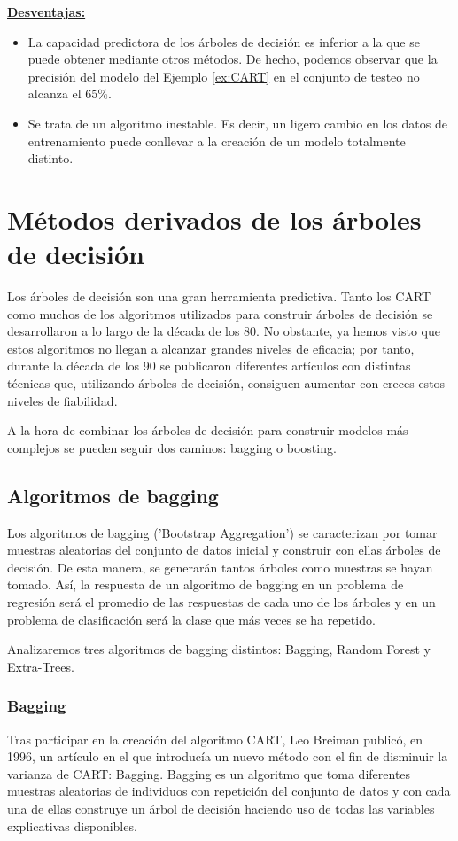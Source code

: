 \documentclass[12pt,twoside]{article}
\begin{document}
\textbf{\underline{Desventajas:}}
\begin{itemize}
\item La capacidad predictora de los árboles de decisión es inferior a la que se puede obtener mediante otros métodos. De hecho, podemos observar que la precisión del modelo del Ejemplo \ref{ex:CART} en el conjunto de testeo no alcanza el $65\%$.
\item Se trata de un algoritmo inestable. Es decir, un ligero cambio en los datos de entrenamiento puede conllevar a la creación de un modelo totalmente distinto. %
\end{itemize}



\newpage
\section{Métodos derivados de los árboles de decisión}
Los árboles de decisión son una gran herramienta predictiva. Tanto los CART como muchos de los algoritmos utilizados para construir árboles de decisión se desarrollaron a lo largo de la década de los 80. No obstante, ya hemos visto que estos algoritmos no llegan a alcanzar grandes niveles de eficacia; por tanto, durante la década de los 90 se publicaron diferentes artículos con distintas técnicas que, utilizando árboles de decisión, consiguen aumentar con creces estos niveles de fiabilidad.

A la hora de combinar los árboles de decisión para construir modelos más complejos se pueden seguir dos caminos: bagging o boosting.


\subsection{Algoritmos de bagging}
Los algoritmos de bagging ('Bootstrap Aggregation') se caracterizan por tomar muestras aleatorias del conjunto de datos inicial y construir con ellas árboles de decisión. De esta manera, se generarán tantos árboles como muestras se hayan tomado. Así, la respuesta de un algoritmo de bagging en un problema de regresión será el promedio de las respuestas de cada uno de los árboles y en un problema de clasificación será la clase que más veces se ha repetido.

Analizaremos tres algoritmos de bagging distintos: Bagging, Random Forest y Extra-Trees.


\subsubsection{Bagging}
Tras participar en la creación del algoritmo CART, Leo Breiman publicó, en 1996, un artículo en el que introducía un nuevo método con el fin de disminuir la varianza de CART: Bagging. Bagging es un algoritmo que toma diferentes muestras aleatorias de individuos con repetición del conjunto de datos y con cada una de ellas construye un árbol de decisión haciendo uso de todas las variables explicativas disponibles.
\end{document}
